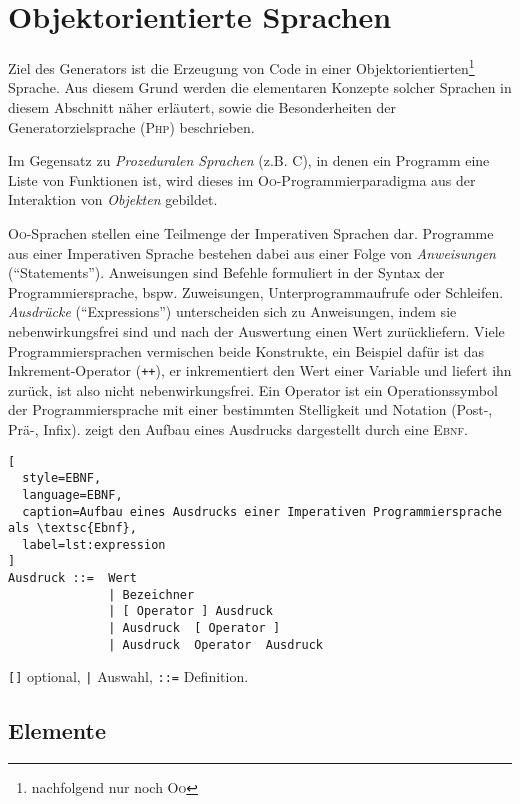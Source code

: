 \section{Objektorientierte Sprachen}
\label{sec:oo_languages}

Ziel des Generators ist die Erzeugung von Code in einer Objektorientierten\footnote{nachfolgend nur noch \textsc{Oo}} Sprache. Aus diesem Grund werden die elementaren Konzepte solcher Sprachen in diesem Abschnitt näher erläutert, sowie die Besonderheiten der Generatorzielsprache (\textsc{Php}) beschrieben.

Im Gegensatz zu \emph{Prozeduralen Sprachen} (z.B. C), in denen ein Programm eine Liste von Funktionen ist, wird dieses im \textsc{Oo}-Programmierparadigma aus der Interaktion von \emph{Objekten} gebildet. 

\textsc{Oo}-Sprachen stellen eine Teilmenge der Imperativen Sprachen dar. Programme aus einer Imperativen Sprache bestehen dabei aus einer Folge von \emph{Anweisungen} (\enquote{Statements}). Anweisungen sind Befehle formuliert in der Syntax der Programmiersprache, bspw. Zuweisungen, Unterprogrammaufrufe oder Schleifen. \emph{Ausdrücke} (\enquote{Expressions}) unterscheiden sich zu Anweisungen, indem sie nebenwirkungsfrei sind und nach der Auswertung einen Wert zurückliefern. Viele Programmiersprachen vermischen beide Konstrukte, ein Beispiel dafür ist das Inkrement-Operator (\texttt{++}), er inkrementiert den Wert einer Variable und liefert ihn zurück, ist also nicht nebenwirkungsfrei.
Ein Operator ist ein Operationssymbol der Programmiersprache mit einer bestimmten Stelligkeit und Notation (Post-, Prä-, Infix).
 zeigt den Aufbau eines Ausdrucks dargestellt durch eine \textsc{Ebnf}.

\begin{lstlisting}[
  style=EBNF, 
  language=EBNF,
  caption=Aufbau eines Ausdrucks einer Imperativen Programmiersprache als \textsc{Ebnf},
  label=lst:expression
]
Ausdruck ::=  Wert 
              | Bezeichner
              | [ Operator ] Ausdruck
              | Ausdruck  [ Operator ]
              | Ausdruck  Operator  Ausdruck
\end{lstlisting}
\vspace{-\baselineskip}
{\footnotesize \begin{center} \texttt{[]} optional, \texttt{|} Auswahl, \texttt{::=} Definition. \end{center}}

\subsection{Elemente}
\label{sec:elements_of_object_oriented_languages}

